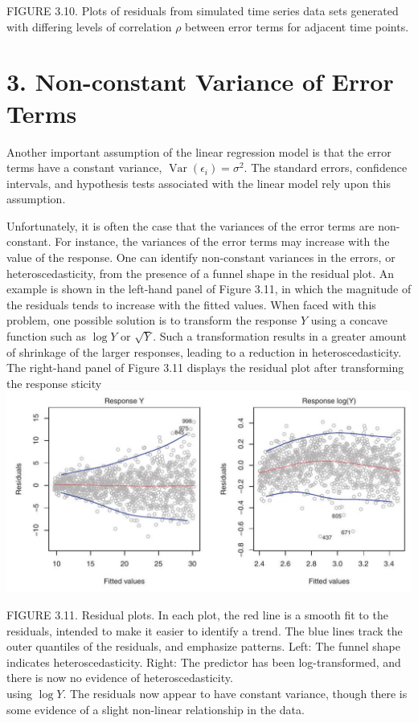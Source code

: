 \documentclass[10pt]{article}
\begin{document}
FIGURE 3.10. Plots of residuals from simulated time series data sets generated with differing levels of correlation $\rho$ between error terms for adjacent time points.

\section*{3. Non-constant Variance of Error Terms}
Another important assumption of the linear regression model is that the error terms have a constant variance, $\operatorname{Var}\left(\epsilon_{i}\right)=\sigma^{2}$. The standard errors, confidence intervals, and hypothesis tests associated with the linear model rely upon this assumption.

Unfortunately, it is often the case that the variances of the error terms are non-constant. For instance, the variances of the error terms may increase with the value of the response. One can identify non-constant variances in the errors, or heteroscedasticity, from the presence of a funnel shape in the residual plot. An example is shown in the left-hand panel of Figure 3.11, in which the magnitude of the residuals tends to increase with the fitted values. When faced with this problem, one possible solution is to transform the response $Y$ using a concave function such as $\log Y$ or $\sqrt{Y}$. Such a transformation results in a greater amount of shrinkage of the larger responses, leading to a reduction in heteroscedasticity. The right-hand panel of Figure 3.11 displays the residual plot after transforming the response sticity\\
\includegraphics[max width=\textwidth, center]{2025_05_05_efe77898333945044de4g-111}

FIGURE 3.11. Residual plots. In each plot, the red line is a smooth fit to the residuals, intended to make it easier to identify a trend. The blue lines track the outer quantiles of the residuals, and emphasize patterns. Left: The funnel shape indicates heteroscedasticity. Right: The predictor has been log-transformed, and there is now no evidence of heteroscedasticity.\\
using $\log Y$. The residuals now appear to have constant variance, though there is some evidence of a slight non-linear relationship in the data.
\end{document}
